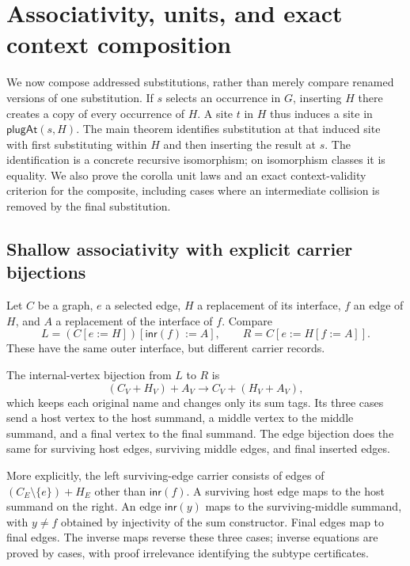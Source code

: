 \section{Associativity, units, and exact context composition}
\label{sec:composition}

We now compose addressed substitutions, rather than merely compare renamed
versions of one substitution. If $s$ selects an occurrence in $G$, inserting
$H$ there creates a copy of every occurrence of $H$. A site $t$ in $H$ thus
induces a site in $\mathsf{plugAt}(s,H)$. The main theorem identifies substitution
at that induced site with first substituting within $H$ and then inserting the
result at $s$. The identification is a concrete recursive isomorphism; on
isomorphism classes it is equality. We also prove the corolla unit laws and
an exact context-validity criterion for the composite, including cases where
an intermediate collision is removed by the final substitution.

\subsection{Shallow associativity with explicit carrier bijections}

Let $C$ be a graph, $e$ a selected edge, $H$ a replacement of its interface,
$f$ an edge of $H$, and $A$ a replacement of the interface of $f$. Compare
\[
 L=(C[e:=H])[\mathsf{inr}(f):=A],\qquad
 R=C[e:=H[f:=A]].
\]
These have the same outer interface, but different carrier records.

\begin{definition}\label{term:reassociation}
The internal-vertex bijection from $L$ to $R$ is
\[
 (C_V+H_V)+A_V\longrightarrow C_V+(H_V+A_V),
\]
which keeps each original name and changes only its sum tags. Its three cases
send a host vertex to the host summand, a middle vertex to the middle summand,
and a final vertex to the final summand. The edge bijection does the same for
surviving host edges, surviving middle edges, and final inserted edges.
\end{definition}
More explicitly, the left surviving-edge carrier consists of edges of
$(C_E\setminus\{e\})+H_E$ other than $\mathsf{inr}(f)$. A surviving host
edge maps to the host summand on the right. An edge $\mathsf{inr}(y)$ maps to
the surviving-middle summand, with $y\ne f$ obtained by injectivity of the sum
constructor. Final edges map to final edges. The inverse maps reverse these
three cases; inverse equations are proved by cases, with proof irrelevance
identifying the subtype certificates.

